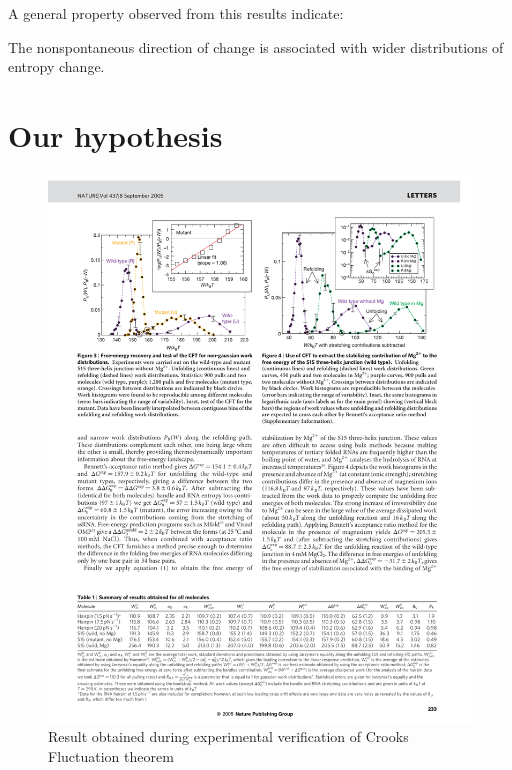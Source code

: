 \documentclass[a0]{sciposter}
\begin{document}
\begin{multicols}{3}
\begin{flushleft}
A general property observed from this results indicate: 

\vspace{0.3cm} 

\begin{tcolorbox}[colframe=green!500!white,colback=white!50!white,boxrule=3pt]
The nonspontaneous direction of change is associated with wider distributions of entropy change.
\end{tcolorbox}


\end{flushleft}

\columnbreak

\section{Our hypothesis}

\begin{minipage}[b]{22.0cm}
\centering
\begin{figure}[ht!]
 \includegraphics[clip, trim=10.5cm 19.5cm 1.0cm 2.1cm, width=20cm]{verification.pdf}
 \caption{Result obtained during experimental verification of Crooks Fluctuation theorem \cite{Collin:2005fxa}}
\label{Fig5} 


\end{figure}
\end{minipage}
\end{multicols}
\end{document}
